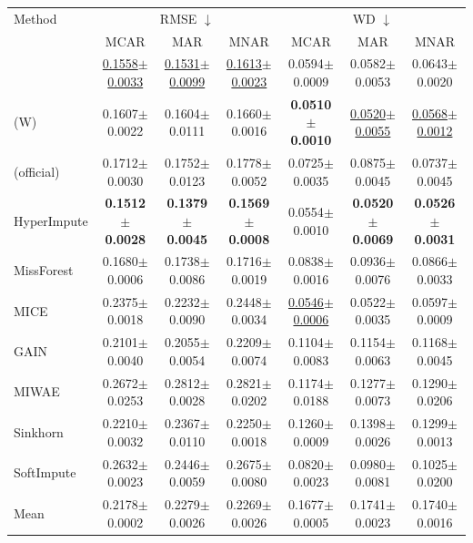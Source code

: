 \begin{tabular}{lcccccc}
\toprule
Method & \multicolumn{3}{c}{RMSE $\downarrow$} & \multicolumn{3}{c}{WD $\downarrow$}\\
 & MCAR & MAR & MNAR & MCAR & MAR & MNAR\\
\midrule
\rmpp{} & \underline{0.1558{\scriptsize$\pm$0.0033}} & \underline{0.1531{\scriptsize$\pm$0.0099}} & \underline{0.1613{\scriptsize$\pm$0.0023}} & 0.0594{\scriptsize$\pm$0.0009} & 0.0582{\scriptsize$\pm$0.0053} & 0.0643{\scriptsize$\pm$0.0020}\\
\rmpp{} (W) & 0.1607{\scriptsize$\pm$0.0022} & 0.1604{\scriptsize$\pm$0.0111} & 0.1660{\scriptsize$\pm$0.0016} & \textbf{0.0510{\scriptsize$\pm$0.0010}} & \underline{0.0520{\scriptsize$\pm$0.0055}} & \underline{0.0568{\scriptsize$\pm$0.0012}}\\
\remasker{} (official) & 0.1712{\scriptsize$\pm$0.0030} & 0.1752{\scriptsize$\pm$0.0123} & 0.1778{\scriptsize$\pm$0.0052} & 0.0725{\scriptsize$\pm$0.0035} & 0.0875{\scriptsize$\pm$0.0045} & 0.0737{\scriptsize$\pm$0.0045}\\
\midrule
HyperImpute & \textbf{0.1512{\scriptsize$\pm$0.0028}} & \textbf{0.1379{\scriptsize$\pm$0.0045}} & \textbf{0.1569{\scriptsize$\pm$0.0008}} & 0.0554{\scriptsize$\pm$0.0010} & \textbf{0.0520{\scriptsize$\pm$0.0069}} & \textbf{0.0526{\scriptsize$\pm$0.0031}}\\
MissForest & 0.1680{\scriptsize$\pm$0.0006} & 0.1738{\scriptsize$\pm$0.0086} & 0.1716{\scriptsize$\pm$0.0019} & 0.0838{\scriptsize$\pm$0.0016} & 0.0936{\scriptsize$\pm$0.0076} & 0.0866{\scriptsize$\pm$0.0033}\\
MICE & 0.2375{\scriptsize$\pm$0.0018} & 0.2232{\scriptsize$\pm$0.0090} & 0.2448{\scriptsize$\pm$0.0034} & \underline{0.0546{\scriptsize$\pm$0.0006}} & 0.0522{\scriptsize$\pm$0.0035} & 0.0597{\scriptsize$\pm$0.0009}\\
GAIN & 0.2101{\scriptsize$\pm$0.0040} & 0.2055{\scriptsize$\pm$0.0054} & 0.2209{\scriptsize$\pm$0.0074} & 0.1104{\scriptsize$\pm$0.0083} & 0.1154{\scriptsize$\pm$0.0063} & 0.1168{\scriptsize$\pm$0.0045}\\
MIWAE & 0.2672{\scriptsize$\pm$0.0253} & 0.2812{\scriptsize$\pm$0.0028} & 0.2821{\scriptsize$\pm$0.0202} & 0.1174{\scriptsize$\pm$0.0188} & 0.1277{\scriptsize$\pm$0.0073} & 0.1290{\scriptsize$\pm$0.0206}\\
Sinkhorn & 0.2210{\scriptsize$\pm$0.0032} & 0.2367{\scriptsize$\pm$0.0110} & 0.2250{\scriptsize$\pm$0.0018} & 0.1260{\scriptsize$\pm$0.0009} & 0.1398{\scriptsize$\pm$0.0026} & 0.1299{\scriptsize$\pm$0.0013}\\
SoftImpute & 0.2632{\scriptsize$\pm$0.0023} & 0.2446{\scriptsize$\pm$0.0059} & 0.2675{\scriptsize$\pm$0.0080} & 0.0820{\scriptsize$\pm$0.0023} & 0.0980{\scriptsize$\pm$0.0081} & 0.1025{\scriptsize$\pm$0.0200}\\
Mean & 0.2178{\scriptsize$\pm$0.0002} & 0.2279{\scriptsize$\pm$0.0026} & 0.2269{\scriptsize$\pm$0.0026} & 0.1677{\scriptsize$\pm$0.0005} & 0.1741{\scriptsize$\pm$0.0023} & 0.1740{\scriptsize$\pm$0.0016}\\
\bottomrule
\end{tabular}
